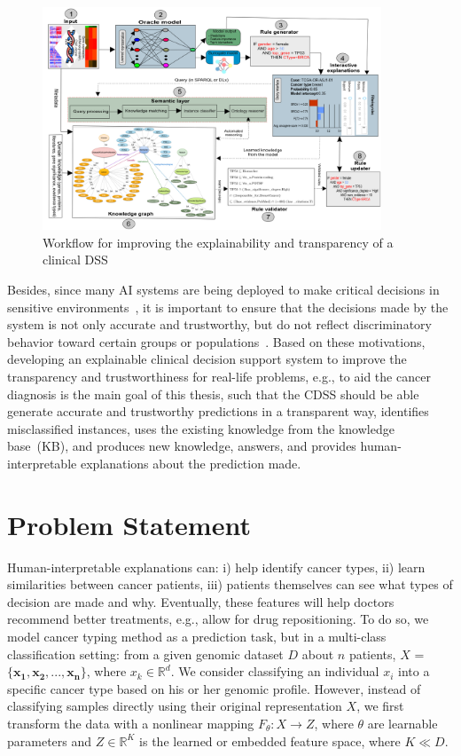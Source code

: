 \begin{figure}
	\centering
	\includegraphics[width=0.9\textwidth]{images/reasoning_wf.png}	
    \caption{Workflow for improving the explainability and transparency of a clinical DSS}
	\label{fig:wf_overall_approach}
\end{figure}

\hspace*{3.5mm} Besides, since many AI systems are being deployed to make critical decisions in sensitive environments~\cite{stiglic2020interpretability}, it is important to ensure that the decisions made by the system is not only accurate and trustworthy, but do not reflect discriminatory behavior toward certain groups or populations~\cite{mehrabi2019survey}. Based on these motivations, developing an explainable clinical decision support system to improve the transparency and trustworthiness for real-life problems, e.g., to aid the cancer diagnosis is the main goal of this thesis, such that the CDSS should be able generate accurate and trustworthy predictions in a transparent way, identifies misclassified instances, uses the existing knowledge from the knowledge base~(KB), and produces new knowledge, answers, and provides human-interpretable explanations about the prediction made. 

\section{Problem Statement} \label{problem_challenges}
Human-interpretable explanations can: i) help identify cancer types, ii) learn similarities between cancer patients, iii) patients themselves can see what types of decision are made and why. Eventually, these features will help doctors recommend better treatments, e.g., allow for drug repositioning. To do so, we model cancer typing method as a prediction task, but in a multi-class classification setting: from a given genomic dataset $D$ about $n$ patients, $X$ = ${\mathbf{\{x_1,x_2,..., x_n}}\}$, where $x_k \in \mathbb{R}^{d}$. We consider classifying an individual $x_i$ into a specific cancer type based on his or her genomic profile. However, instead of classifying samples directly using their original representation $X$, we first transform the data with a nonlinear mapping $F_{\theta}: X \rightarrow Z$, where $\theta$ are learnable parameters and $Z \in \mathbb{R}^{K}$ is the learned or embedded feature space, where $K \ll D$. 

